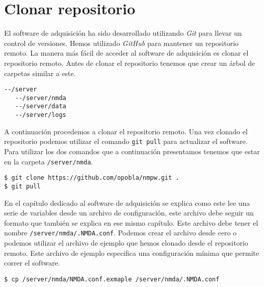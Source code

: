 	\section{Clonar repositorio}
		El software de adquisición ha sido desarrollado utilizando \emph{Git} para llevar un control de versiones. Hemos utilizado
		\emph{GitHub} para mantener un repositorio remoto. La manera más fácil de acceder al software de adquisición es clonar el repositorio
		remoto. Antes de clonar el repositorio tenemos que crear un árbol de carpetas similar a este.
		\begin{lstlisting}[style=myBash]
--/server
   --/server/nmda
   --/server/data
   --/server/logs
		\end{lstlisting}
		A continuación procedemos a clonar el repositorio remoto. Una vez clonado el repositorio podemos utilizar el comando \texttt{git pull}
		para actualizar el software. Para utilizar los dos comandos que a continuación presentamos tenemos que estar en la carpeta
		\texttt{/server/nmda}.
		\begin{lstlisting}[style=myBash]
$ git clone https://github.com/opobla/nmpw.git .
$ git pull
		\end{lstlisting}
		En el capítulo dedicado al software de adquisición se explica como este lee una serie de variables desde un archivo de configuración,
		este archivo debe seguir un formato que también se explica en ese mismo capítulo. Este archivo debe tener el nombre
		\texttt{/server/nmda/.NMDA.conf}. Podemos crear el archivo desde cero o podemos utilizar el archivo de ejemplo que hemos clonado desde
		el repositorio remoto. Este archivo de ejemplo especifica una configuración mínima que permite correr el software. 
		\begin{lstlisting}[style=myBash]
$ cp /server/nmda/NMDA.conf.exmaple /server/nmda/.NMDA.conf
		\end{lstlisting}
